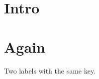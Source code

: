 \documentclass{article}
\begin{document}
\section{Intro}\label{dup}
\section{Again}\label{dup}
Two labels with the same key.
\end{document}
